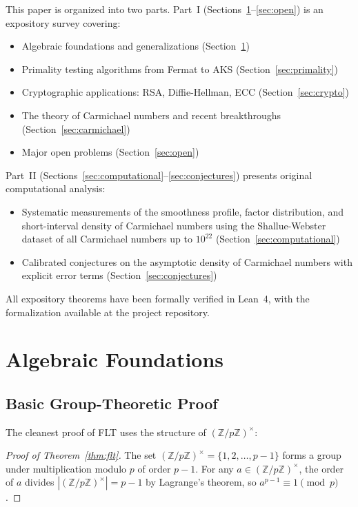 \documentclass{amsart}
\theoremstyle{plain}
\theoremstyle{definition}
\theoremstyle{remark}
\newcommand{\Z}{\mathbb{Z}}
\begin{document}
This paper is organized into two parts. Part~I (Sections~\ref{sec:algebraic}--\ref{sec:open}) is an expository survey covering:
\begin{itemize}
\item Algebraic foundations and generalizations (Section~\ref{sec:algebraic})
\item Primality testing algorithms from Fermat to AKS (Section~\ref{sec:primality})
\item Cryptographic applications: RSA, Diffie-Hellman, ECC (Section~\ref{sec:crypto})
\item The theory of Carmichael numbers and recent breakthroughs (Section~\ref{sec:carmichael})
\item Major open problems (Section~\ref{sec:open})
\end{itemize}

Part~II (Sections~\ref{sec:computational}--\ref{sec:conjectures}) presents original computational analysis:
\begin{itemize}
\item Systematic measurements of the smoothness profile, factor distribution, and short-interval density of Carmichael numbers using the Shallue-Webster dataset of all Carmichael numbers up to $10^{22}$ (Section~\ref{sec:computational})
\item Calibrated conjectures on the asymptotic density of Carmichael numbers with explicit error terms (Section~\ref{sec:conjectures})
\end{itemize}

All expository theorems have been formally verified in Lean~4, with the formalization available at the project repository.

\section{Algebraic Foundations}\label{sec:algebraic}

\subsection{Basic Group-Theoretic Proof}

The cleanest proof of FLT uses the structure of $(\Z/p\Z)^\times$:

\begin{proof}[Proof of Theorem~\ref{thm:flt}]
The set $(\Z/p\Z)^\times = \{1, 2, \ldots, p-1\}$ forms a group under multiplication modulo $p$ of order $p-1$. For any $a \in (\Z/p\Z)^\times$, the order of $a$ divides $|(\Z/p\Z)^\times| = p-1$ by Lagrange's theorem, so $a^{p-1} \equiv 1 \pmod{p}$.
\end{proof}
\end{document}
